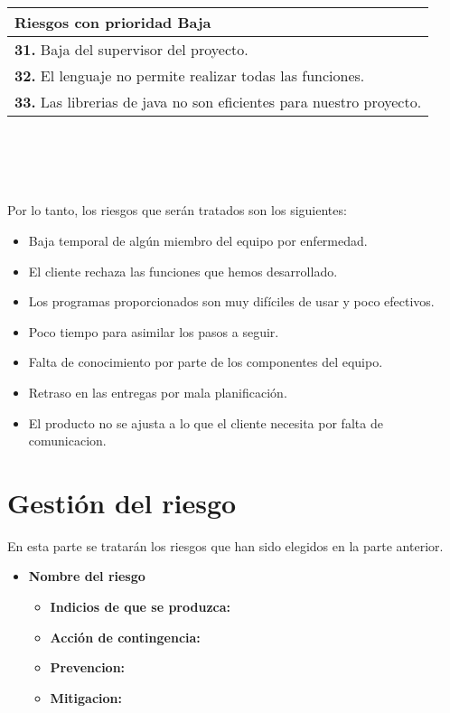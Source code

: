\documentclass[spanish,a4paper,12pt]{report}	%
\begin{document}
			\begin{tabular}{|p{12cm}|}
				\hline
				\textbf{Riesgos con prioridad Baja}\\ \hline \hline
				\textbf{31.} Baja del supervisor del proyecto.\\ \hline 
				\textbf{32.} El lenguaje no permite realizar todas las funciones.\\ \hline
				\textbf{33.} Las librerias de java no son eficientes para nuestro proyecto. \\ \hline
			\end{tabular}
			\ \\
			\ \\
			\ \\
			\ \\
			Por lo tanto, los riesgos que serán tratados son los siguientes:
			\begin{itemize}
			  \item Baja temporal de algún miembro del equipo por enfermedad.
			  \item El cliente rechaza las funciones que hemos desarrollado.
			  \item Los programas proporcionados son muy difíciles de usar y poco efectivos.
			  \item Poco tiempo para asimilar los pasos a seguir. 
			  \item Falta de conocimiento por parte de los componentes del equipo. 
			  \item Retraso en las entregas por mala planificación. 
			  \item El producto no se ajusta a lo que el cliente necesita por falta de comunicacion. 
			\end{itemize}
			

\part{Gestión del riesgo}
	En esta parte se tratarán los riesgos que han sido elegidos en la parte anterior.
	\begin{itemize}
	\item \textbf{Nombre del riesgo}			%
		\begin{itemize}
			\item \textbf {Indicios de que se produzca: }
			\item \textbf {Acción de contingencia: }
			\item \textbf {Prevencion: }
			\item \textbf {Mitigacion: }
		\end{itemize}
	\end{itemize}
	
\end{document}

